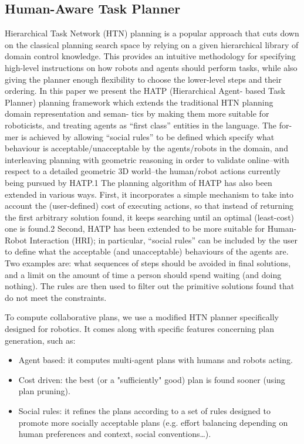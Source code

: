 \subsection{Human-Aware Task Planner}
Hierarchical Task Network (HTN) planning is a popular approach that cuts down on the classical planning search space
by relying on a given hierarchical library of domain control knowledge. This provides an intuitive methodology for
specifying high-level instructions on how robots and agents should perform tasks, while also giving the planner enough 
flexibility to choose the lower-level steps and their ordering. In this paper we present the HATP (Hierarchical Agent-
based Task Planner) planning framework which extends the traditional HTN planning domain representation and seman-
tics by making them more suitable for roboticists, and treating agents as “first class” entities in the language. The for-
mer is achieved by allowing “social rules” to be defined which specify what behaviour is acceptable/unacceptable by
the agents/robots in the domain, and interleaving planning with geometric reasoning in order to validate online–with
respect to a detailed geometric 3D world–the human/robot actions currently being pursued by HATP.1
The planning algorithm of HATP has also been extended in various ways. First, it incorporates a simple mechanism
to take into account the (user-defined) cost of executing actions, so that instead of returning the first arbitrary solution
found, it keeps searching until an optimal (least-cost) one is found.2 Second, HATP has been extended to be more
suitable for Human-Robot Interaction (HRI); in particular, “social rules” can be included by the user to define what
the acceptable (and unacceptable) behaviours of the agents are. Two examples are: what sequences of steps should be
avoided in final solutions, and a limit on the amount of time a person should spend waiting (and doing nothing). The rules
are then used to filter out the primitive solutions found that do not meet the constraints.

To compute collaborative plans, we use a modified HTN planner specifically designed for robotics.
It comes along with specific features concerning plan generation, such as:

\begin{itemize}
\item Agent based: it computes multi-agent plans with humans and robots acting.
\item Cost driven: the best (or a "sufficiently" good) plan is found sooner (using plan pruning).
\item Social rules: it refines the plans according to a set of rules designed to promote more socially acceptable plans  (e.g. effort balancing depending on human preferences and context, social conventions\ldots).
\end{itemize}

